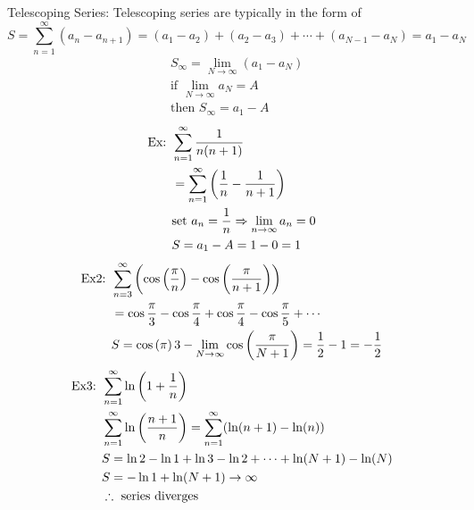 \documentclass[11pt, fleqn]{article}
\begin{document}
Telescoping Series:
Telescoping series are typically in the form of
$$S=\sum_{n=1}^\infty(a_n-a_{n+1})=(a_1-a_2)+(a_2-a_3)+\cdots+(a_{N-1}-a_N)=a_1-a_N$$
\begin{align*}
    &S_\infty=\lim_{N\to\infty}(a_1-a_N)\\
    &\text{if }\lim_{N\to\infty}a_N=A\\
    &\text{then }S_\infty=a_1-A
\end{align*}
\begin{align*}
    \text{Ex: }&\sum_{n=1}^\infty\frac{1}{n(n+1)}\\
    &=\sum_{n=1}^\infty\left( \frac{1}{n}-\frac{1}{n+1} \right)\\
    &\text{set }a_n=\frac{1}{n}\Rightarrow \lim_{n\to\infty}a_n=0\\
    &S=a_1-A=1-0=1
\end{align*}
\begin{align*}
    \text{Ex2: }&\sum_{n=3}^\infty\left( \cos\left( \frac{\pi}{n} \right)-\cos\left( \frac{\pi}{n+1} \right) \right)\\
    &=\cos\frac{\pi}{3}-\cos\frac{\pi}{4}+\cos\frac{\pi}{4}-\cos\frac{\pi}{5}+\cdots\\
    &S=\cos\left( \pi \right){3}-\lim_{N\to\infty}\cos\left( \frac{\pi}{N+1} \right)=\frac{1}{2}-1=-\frac{1}{2}
\end{align*}
\begin{align*}
    \text{Ex3: }&\sum_{n=1}^\infty\ln\left( 1+\frac{1}{n} \right)\\
    &\sum_{n=1}^\infty\ln\left( \frac{n+1}{n} \right)=\sum_{n=1}^\infty(\ln(n+1)-\ln(n))\\
    &S=\ln2-\ln1+\ln3-\ln2+\cdots+\ln(N+1)-\ln(N)\\
    &S=-\ln1+\ln(N+1)\to\infty\\
    &\therefore \text{ series diverges}
\end{align*}
\end{document}
